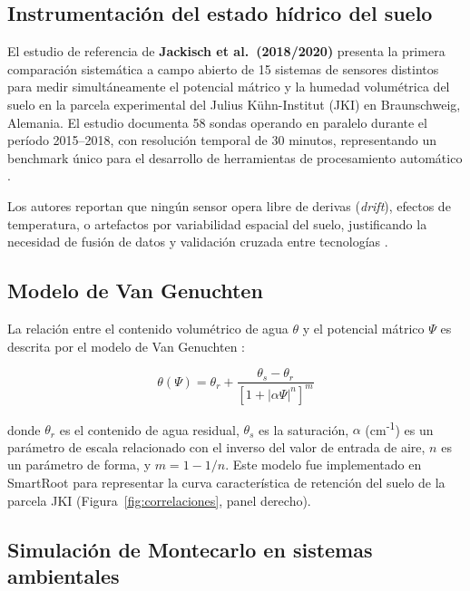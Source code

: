\documentclass[12pt,a4paper]{article}
\begin{document}
\subsection{Instrumentación del estado hídrico del suelo}

El estudio de referencia de \textbf{Jackisch et al.\ (2018/2020)} \cite{jackisch2020} presenta la primera comparación sistemática a campo abierto de 15 sistemas de sensores distintos para medir simultáneamente el potencial mátrico y la humedad volumétrica del suelo en la parcela experimental del Julius Kühn-Institut (JKI) en Braunschweig, Alemania. El estudio documenta 58 sondas operando en paralelo durante el período 2015--2018, con resolución temporal de 30 minutos, representando un benchmark único para el desarrollo de herramientas de procesamiento automático \cite{jackisch2018pangaea}.

Los autores reportan que ningún sensor opera libre de derivas (\textit{drift}), efectos de temperatura, o artefactos por variabilidad espacial del suelo, justificando la necesidad de fusión de datos y validación cruzada entre tecnologías \cite{jackisch2020}.

\subsection{Modelo de Van Genuchten}

La relación entre el contenido volumétrico de agua $\theta$ y el potencial mátrico $\Psi$ es descrita por el modelo de Van Genuchten \cite{vangenuchten1980}:

\begin{equation}
\theta(\Psi) = \theta_r + \frac{\theta_s - \theta_r}{\left[1 + |\alpha \Psi|^n\right]^m}
\label{eq:vangenuchten}
\end{equation}

\noindent donde $\theta_r$ es el contenido de agua residual, $\theta_s$ es la saturación, $\alpha$ (cm\textsuperscript{-1}) es un parámetro de escala relacionado con el inverso del valor de entrada de aire, $n$ es un parámetro de forma, y $m = 1 - 1/n$. Este modelo fue implementado en SmartRoot para representar la curva característica de retención del suelo de la parcela JKI (Figura~\ref{fig:correlaciones}, panel derecho).

\subsection{Simulación de Montecarlo en sistemas ambientales}
\end{document}
